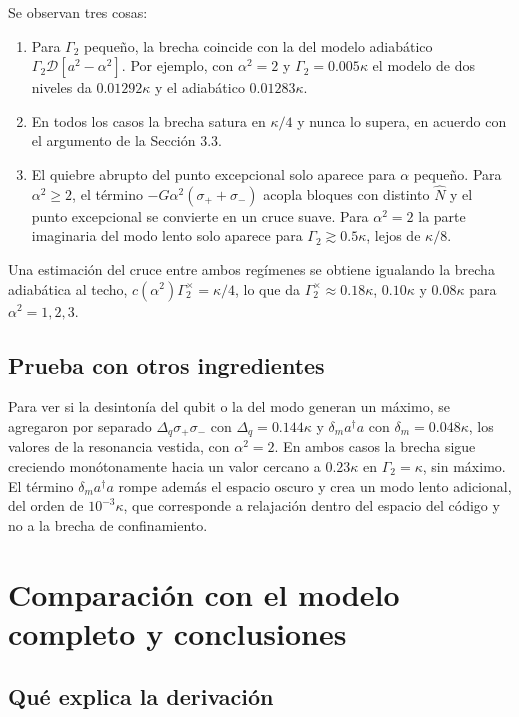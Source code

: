 \documentclass[11pt]{report}
\newcommand{\spl}{\sigma_{+}}
\newcommand{\smi}{\sigma_{-}}
\newcommand{\GG}{\Gamma_{2}}
\begin{document}
Se observan tres cosas:
\begin{enumerate}
\item Para $\GG$ peque\~no, la brecha coincide con la del modelo adiab\'atico $\GG\mathcal{D}[a^{2}-\alpha^{2}]$. Por ejemplo, con $\alpha^{2}=2$ y $\GG=0.005\kappa$ el modelo de dos niveles da $0.01292\kappa$ y el adiab\'atico $0.01283\kappa$.
\item En todos los casos la brecha satura en $\kappa/4$ y nunca lo supera, en acuerdo con el argumento de la Secci\'on 3.3.
\item El quiebre abrupto del punto excepcional solo aparece para $\alpha$ peque\~no. Para $\alpha^{2}\geq2$, el t\'ermino $-G\alpha^{2}(\spl+\smi)$ acopla bloques con distinto $\hat N$ y el punto excepcional se convierte en un cruce suave. Para $\alpha^{2}=2$ la parte imaginaria del modo lento solo aparece para $\GG\gtrsim0.5\kappa$, lejos de $\kappa/8$.
\end{enumerate}
Una estimaci\'on del cruce entre ambos reg\'imenes se obtiene igualando la brecha adiab\'atica al techo, $c(\alpha^{2})\GG^{\times}=\kappa/4$, lo que da $\GG^{\times}\approx0.18\kappa$, $0.10\kappa$ y $0.08\kappa$ para $\alpha^{2}=1,2,3$.

\subsection{Prueba con otros ingredientes}

Para ver si la desinton\'ia del qubit o la del modo generan un m\'aximo, se agregaron por separado $\Delta_{q}\spl\smi$ con $\Delta_{q}=0.144\kappa$ y $\delta_{m}a^{\dagger}a$ con $\delta_{m}=0.048\kappa$, los valores de la resonancia vestida, con $\alpha^{2}=2$. En ambos casos la brecha sigue creciendo mon\'otonamente hacia un valor cercano a $0.23\kappa$ en $\GG=\kappa$, sin m\'aximo. El t\'ermino $\delta_{m}a^{\dagger}a$ rompe adem\'as el espacio oscuro y crea un modo lento adicional, del orden de $10^{-3}\kappa$, que corresponde a relajaci\'on dentro del espacio del c\'odigo y no a la brecha de confinamiento.

\section{Comparaci\'on con el modelo completo y conclusiones}

\subsection{Qu\'e explica la derivaci\'on}
\end{document}
